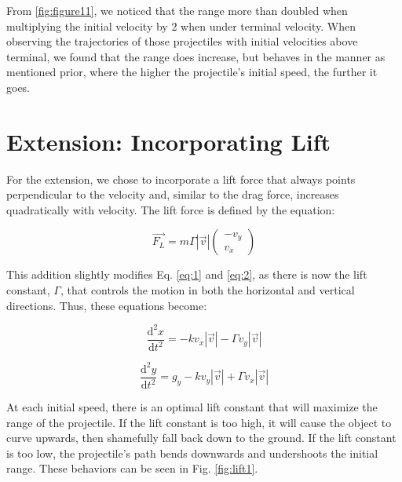 \documentclass[12pt]{iopart} %
\begin{document}
From \ref{fig:figure11}, we noticed that the range more than doubled when multiplying the initial velocity by 2 when under terminal velocity. 
When observing the trajectories of those projectiles with initial velocities above terminal, we found that the range does increase, but behaves in the manner as mentioned prior, where the higher the projectile's initial speed, the further it goes. 

\pagebreak

\section{Extension: Incorporating Lift}

For the extension, we chose to incorporate a lift force that always points perpendicular to the velocity and, similar to the drag force, increases quadratically with velocity.
The lift force is defined by the equation:

\begin{equation} \label{eq:3}
  \vec{F_{L}} = m \Gamma |\vec{v}|
  \begin{pmatrix}
    -v_{y} \\
    v_{x}
  \end{pmatrix}

\end{equation}

This addition slightly modifies Eq. \ref{eq:1} and \ref{eq:2}, as there is now the lift constant, $\Gamma$, that controls the motion in both the horizontal and vertical directions.
Thus, these equations become:

\begin{equation} \label{eq:4}
  \frac{\mathrm{d}^2 x}{\mathrm{d}t^2} = -k v_x |\vec{v}| - \Gamma v_y |\vec{v}|
\end{equation}

\begin{equation} \label{eq:5}
  \frac{\mathrm{d}^2 y}{\mathrm{d}t^2} = g_y - k v_y |\vec{v}| + \Gamma v_x |\vec{v}|
\end{equation}

At each initial speed, there is an optimal lift constant that will maximize the range of the projectile.
If the lift constant is too high, it will cause the object to curve upwards, then shamefully fall back down to the ground.
If the lift constant is too low, the projectile's path bends downwards and undershoots the initial range.
These behaviors can be seen in Fig. \ref{fig:lift1}.
\end{document}
